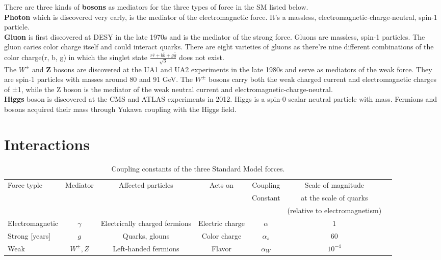 There are three kinds of \textbf{bosons} as mediators for the three types of force in the SM listed below.\\ 
\textbf{Photon} which is discovered very early, is the mediator of the electromagnetic force. It's a massless, electromagnetic-charge-neutral, spin-1 particle.\\
\textbf{Gluon} is first discovered at DESY in the late 1970s and is the mediator of the strong force. Gluons are massless, spin-1 particles.  The gluon caries color charge itself and could interact quarks. There are eight varieties of gluons as there’re nine different combinations of the color charge(r, b, g) in which the singlet state $\frac{r\bar{r}+b\bar{b}+g\bar{g}}{\sqrt{3}}$ does not exist.\\
The \textbf{$W^{\pm}$} and \textbf{Z} bosons are discovered at the UA1 and UA2 experiments in the late 1980s and serve as mediators of the weak force. They are spin-1 particles with masses around 80 and 91 GeV. The \textbf{$W^{\pm}$} bosons carry both the weak charged current and electromagnetic charges of ±1, while the Z boson is the mediator of the weak neutral current and electromagnetic-charge-neutral.\\
\textbf{Higgs} boson is discovered at the CMS and ATLAS experiments in 2012.
Higgs is a spin-0 scalar neutral particle with mass. Fermions and bosons acquired their mass through Yukawa coupling with the Higgs field. 
\section{Interactions}
\begin{table}[tbh]
\centering
\tiny
\begin{tabular}{|l|c|c|c|c|c|c}
\hline
    Force typle & Mediator & Affected particles & Acts on & Coupling& Scale of magnitude\\
    &&&&Constant &at the scale of quarks\\
    &&&&& (relative to electromagnetism)\\
\hline
\hline
    Electromagnetic  & $\gamma$&Electrically charged fermions&Electric charge& $\alpha$ &$1$\\
    Strong [years] & $g$ &Quarks, glouns & Color charge& $\alpha_s$ &$60$\\
    Weak & $W^{\pm}, Z$ &Left-handed fermions & Flavor& $\alpha_W$ &$10^{-4}$\\
\hline

\end{tabular}
\caption{Coupling constants of the three Standard Model forces. }
\label{tab:forces}
\end{table}

